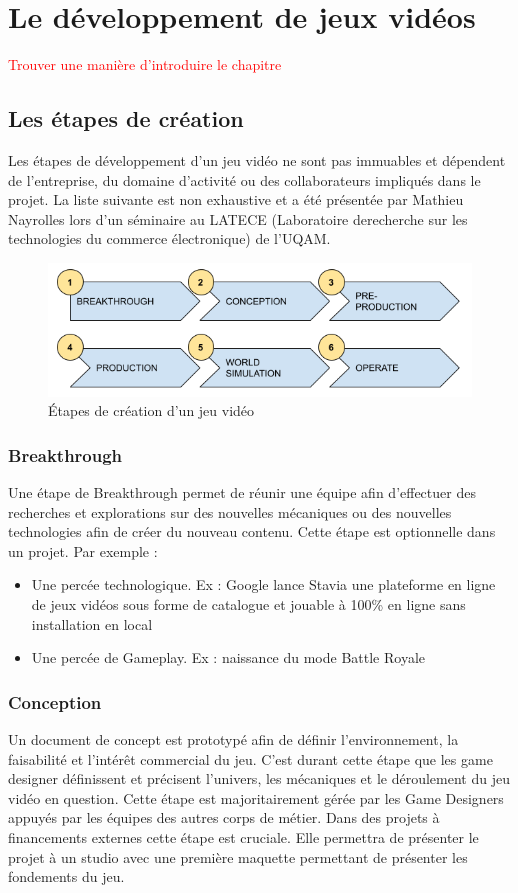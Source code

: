 \chapter{Le développement de jeux vidéos}
 \textcolor{red}{Trouver une manière d'introduire le chapitre}
 
\section{Les étapes de création}
Les étapes de développement d'un jeu vidéo ne sont pas immuables et dépendent de l'entreprise, du domaine d'activité ou des collaborateurs impliqués dans le projet. La liste suivante est non exhaustive et a été présentée par Mathieu Nayrolles lors d’un séminaire au LATECE (Laboratoire derecherche sur les technologies du commerce électronique) de l’UQAM.
\begin{figure}[H]
    \centering
    \includegraphics[width=14cm]{10_img/production_stages.png} 
    \caption{Étapes de création d'un jeu vidéo}
\end{figure}
\subsection{Breakthrough}
Une étape de Breakthrough permet de réunir une équipe afin d'effectuer des recherches et explorations sur des nouvelles mécaniques ou des nouvelles technologies afin de créer du nouveau contenu. Cette étape est optionnelle dans un projet.
Par exemple :
\begin{itemize}
    \item Une percée technologique. Ex : Google lance Stavia une plateforme en ligne de jeux vidéos sous forme de catalogue et jouable à 100\% en ligne sans installation en local
    \item Une percée de Gameplay. Ex : naissance du mode Battle Royale
\end{itemize}

\subsection{Conception}
Un document de concept est prototypé afin de définir l'environnement, la faisabilité et l'intérêt commercial du jeu. C'est durant cette étape que les game designer définissent et précisent l'univers, les mécaniques et le déroulement du jeu vidéo en question. Cette étape est majoritairement gérée par les Game Designers appuyés par les équipes des autres corps de métier. Dans des projets à financements externes cette étape est cruciale. Elle permettra de présenter le projet à un studio avec une première maquette permettant de présenter les fondements du jeu.

